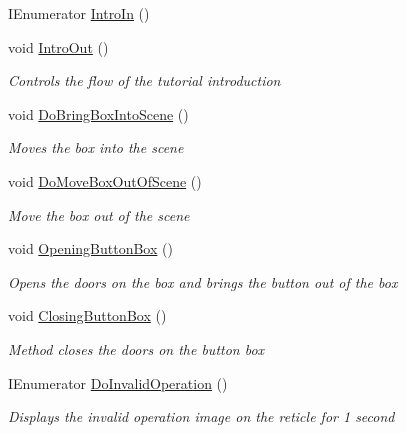 \begin{DoxyCompactItemize}
I\+Enumerator \mbox{\hyperlink{class_intro_session_manager_a1f4d274eb1210032091a14668007010e}{Intro\+In}} ()
\item 
void \mbox{\hyperlink{class_intro_session_manager_a96f4ea7bcbd9459bf04ccc1663cc7259}{Intro\+Out}} ()
\begin{DoxyCompactList}\small\item\em Controls the flow of the tutorial introduction \end{DoxyCompactList}\item 
void \mbox{\hyperlink{class_intro_session_manager_a8ea998890634808b09e0f05a68d81d64}{Do\+Bring\+Box\+Into\+Scene}} ()
\begin{DoxyCompactList}\small\item\em Moves the box into the scene \end{DoxyCompactList}\item 
void \mbox{\hyperlink{class_intro_session_manager_a1458287c5067948bca87eaeb05dc9ebf}{Do\+Move\+Box\+Out\+Of\+Scene}} ()
\begin{DoxyCompactList}\small\item\em Move the box out of the scene \end{DoxyCompactList}\item 
void \mbox{\hyperlink{class_intro_session_manager_ae9859df135187ffdfccd320d8d011500}{Opening\+Button\+Box}} ()
\begin{DoxyCompactList}\small\item\em Opens the doors on the box and brings the button out of the box \end{DoxyCompactList}\item 
void \mbox{\hyperlink{class_intro_session_manager_a58ae098b28554a98916370ad0647fd87}{Closing\+Button\+Box}} ()
\begin{DoxyCompactList}\small\item\em Method closes the doors on the button box \end{DoxyCompactList}\item 
I\+Enumerator \mbox{\hyperlink{class_intro_session_manager_ad0caff53bd4a5a65499e13c4a2f20212}{Do\+Invalid\+Operation}} ()
\begin{DoxyCompactList}\small\item\em Displays the invalid operation image on the reticle for 1 second \end{DoxyCompactList}\end{DoxyCompactItemize}
